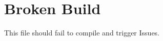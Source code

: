 \documentclass{article}
\begin{document}
\section{Broken Build}
This file should fail to compile and trigger Issues.
\undefinedcommand
\end{document}
